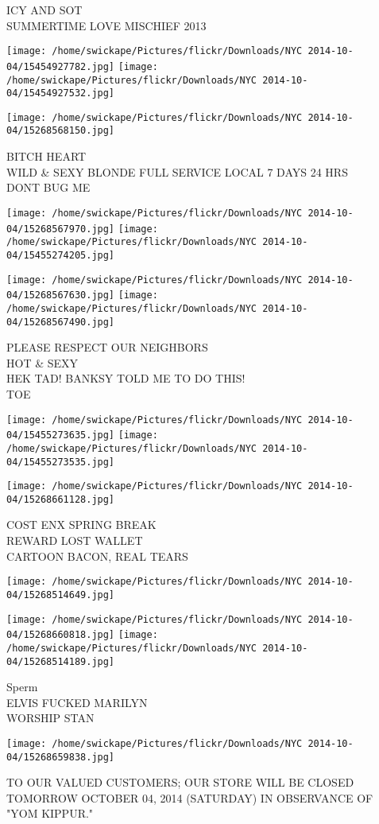 \documentclass[10pt,letterpaper]{article}
\begin{document}
ICY AND SOT\\
SUMMERTIME LOVE MISCHIEF 2013
\pagebreak

\texttt{[image: /home/swickape/Pictures/flickr/Downloads/NYC 2014-10-04/15454927782.jpg]}
\texttt{[image: /home/swickape/Pictures/flickr/Downloads/NYC 2014-10-04/15454927532.jpg]}

\vspace{0.25in}
\texttt{[image: /home/swickape/Pictures/flickr/Downloads/NYC 2014-10-04/15268568150.jpg]}

BITCH HEART\\
WILD \& SEXY BLONDE FULL SERVICE LOCAL 7 DAYS 24 HRS\\
DONT BUG ME
\pagebreak

\texttt{[image: /home/swickape/Pictures/flickr/Downloads/NYC 2014-10-04/15268567970.jpg]}
\texttt{[image: /home/swickape/Pictures/flickr/Downloads/NYC 2014-10-04/15455274205.jpg]}

\texttt{[image: /home/swickape/Pictures/flickr/Downloads/NYC 2014-10-04/15268567630.jpg]}
\texttt{[image: /home/swickape/Pictures/flickr/Downloads/NYC 2014-10-04/15268567490.jpg]}

PLEASE RESPECT OUR NEIGHBORS\\
HOT \& SEXY\\
HEK TAD! BANKSY TOLD ME TO DO THIS!\\
TOE
\pagebreak

\texttt{[image: /home/swickape/Pictures/flickr/Downloads/NYC 2014-10-04/15455273635.jpg]}
\texttt{[image: /home/swickape/Pictures/flickr/Downloads/NYC 2014-10-04/15455273535.jpg]}

\vspace{0.25in}
\texttt{[image: /home/swickape/Pictures/flickr/Downloads/NYC 2014-10-04/15268661128.jpg]}

COST ENX SPRING BREAK\\
REWARD LOST WALLET\\
CARTOON BACON, REAL TEARS
\pagebreak

\texttt{[image: /home/swickape/Pictures/flickr/Downloads/NYC 2014-10-04/15268514649.jpg]}

\vspace{0.25in}
\texttt{[image: /home/swickape/Pictures/flickr/Downloads/NYC 2014-10-04/15268660818.jpg]}
\texttt{[image: /home/swickape/Pictures/flickr/Downloads/NYC 2014-10-04/15268514189.jpg]}

Sperm\\
ELVIS FUCKED MARILYN\\
WORSHIP STAN
\pagebreak

\texttt{[image: /home/swickape/Pictures/flickr/Downloads/NYC 2014-10-04/15268659838.jpg]}

TO OUR VALUED CUSTOMERS; OUR STORE WILL BE CLOSED TOMORROW OCTOBER 04, 2014 (SATURDAY) IN OBSERVANCE OF "YOM KIPPUR."
\pagebreak
\end{document}
